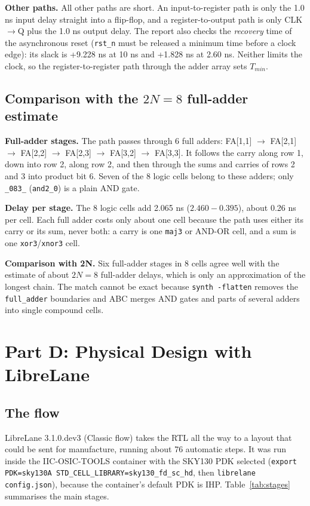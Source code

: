 \documentclass[10pt,a4paper,twocolumn]{article}
\newcommand{\cell}[1]{\texttt{#1}}
\begin{document}
\textbf{Other paths.} All other paths are short. An input-to-register path is only the 1.0 ns input delay
straight into a flip-flop, and a register-to-output path is only CLK$\rightarrow$Q plus the 1.0 ns output delay.
The report also checks the \emph{recovery} time of the asynchronous reset (\texttt{rst\_n} must be released a
minimum time before a clock edge): its slack is +9.228 ns at 10 ns and +1.828 ns at 2.60 ns. Neither limits the
clock, so the register-to-register path through the adder array sets $T_{min}$.

\subsection{Comparison with the $2N = 8$ full-adder estimate}

\textbf{Full-adder stages.} The path passes through 6 full adders: FA[1,1] $\rightarrow$ FA[2,1] $\rightarrow$
FA[2,2] $\rightarrow$ FA[2,3] $\rightarrow$ FA[3,2] $\rightarrow$ FA[3,3]. It follows the carry along row 1, down
into row 2, along row 2, and then through the sums and carries of rows 2 and 3 into product bit 6. Seven of the
8 logic cells belong to these adders; only \cell{\_083\_} (\cell{and2\_0}) is a plain AND gate.

\textbf{Delay per stage.} The 8 logic cells add 2.065 ns ($2.460 - 0.395$), about 0.26 ns per cell. Each full
adder costs only about one cell because the path uses either its carry or its sum, never both: a carry is one
\cell{maj3} or AND-OR cell, and a sum is one \cell{xor3}/\cell{xnor3} cell.

\textbf{Comparison with 2N.} Six full-adder stages in 8 cells agree well with the estimate of about $2N = 8$
full-adder delays, which is only an approximation of the longest chain. The match cannot be exact because
\texttt{synth -flatten} removes the \texttt{full\_adder} boundaries and ABC merges AND gates and parts of several
adders into single compound cells.

\section{Part D: Physical Design with LibreLane}

\subsection{The flow}

LibreLane 3.1.0.dev3 (Classic flow) takes the RTL all the way to a layout that could be sent for
manufacture, running about 76 automatic steps. It was run inside the IIC-OSIC-TOOLS container with the
SKY130 PDK selected (\texttt{export PDK=sky130A STD\_CELL\_LIBRARY=sky130\_fd\_sc\_hd}, then
\texttt{librelane config.json}), because the container's default PDK is IHP. Table~\ref{tab:stages} summarises
the main stages.
\end{document}
